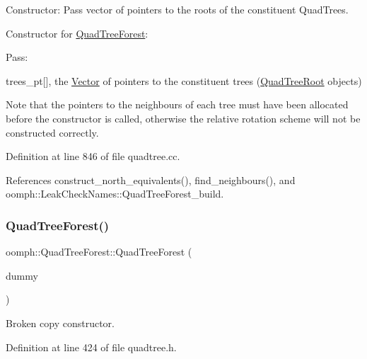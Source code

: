Constructor\+: Pass vector of pointers to the roots of the constituent Quad\+Trees. 

Constructor for \hyperlink{classoomph_1_1QuadTreeForest}{Quad\+Tree\+Forest}\+:

Pass\+:
\begin{DoxyItemize}
\item trees\+\_\+pt\mbox{[}\mbox{]}, the \hyperlink{classoomph_1_1Vector}{Vector} of pointers to the constituent trees (\hyperlink{classoomph_1_1QuadTreeRoot}{Quad\+Tree\+Root} objects)
\end{DoxyItemize}

Note that the pointers to the neighbour\textquotesingle{}s of each tree must have been allocated before the constructor is called, otherwise the relative rotation scheme will not be constructed correctly. 

Definition at line 846 of file quadtree.\+cc.



References construct\+\_\+north\+\_\+equivalents(), find\+\_\+neighbours(), and oomph\+::\+Leak\+Check\+Names\+::\+Quad\+Tree\+Forest\+\_\+build.

\mbox{\label{classoomph_1_1QuadTreeForest_afe67a5b43ac90baac0d71dbaed0cdc49}} 
\subsubsection{\texorpdfstring{Quad\+Tree\+Forest()}{QuadTreeForest()}\hspace{0.1cm}{\footnotesize\ttfamily [3/3]}}
{\footnotesize\ttfamily oomph\+::\+Quad\+Tree\+Forest\+::\+Quad\+Tree\+Forest (\begin{DoxyParamCaption}\item[{const \hyperlink{classoomph_1_1QuadTreeForest}{Quad\+Tree\+Forest} \&}]{dummy }\end{DoxyParamCaption})\hspace{0.3cm}{\ttfamily [inline]}}



Broken copy constructor. 



Definition at line 424 of file quadtree.\+h.



